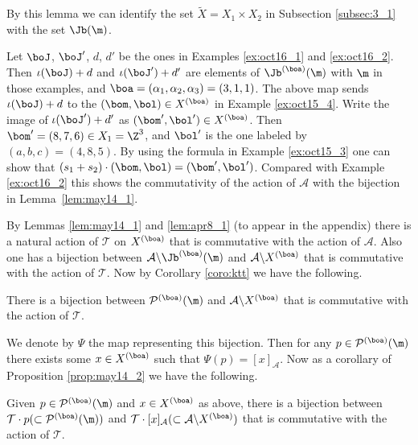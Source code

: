 By this lemma we can identify the set $\tilde{X} = X_1 \times X_2$ in Subsection \ref{subsec:3_1}
with the set
$\Jb (\m)$.

\begin{example}\label{ex:oct16_3}
Let $\boJ$, $\boJ'$, $d$, $d'$ be the ones in Examples \ref{ex:oct16_1} and \ref{ex:oct16_2}.
Then
$\iota (\boJ) + d$ and $\iota (\boJ') + d'$ are elements of $\Jb^{(\boa)} (\m)$ with
$\m$ in those examples, and $\boa = (\alpha_1, \alpha_2, \alpha_3) = (3,1,1)$.
%
The above map sends $\iota (\boJ) + d$ to the $(\bom, \bol) \in X^{(\boa)}$ in Example \ref{ex:oct15_4}.
Write the image of $\iota (\boJ') + d'$ as $(\bom', \bol') \in X^{(\boa)}$.
Then $\bom' = (8,7,6) \in X_1 = \Z^3$, and $\bol'$ is the one labeled by $(a,b,c) = (4,8,5)$.
%
By using the formula in Example \ref{ex:oct15_3} one can show that $(s_1 + s_2) \cdot (\bom, \bol) = (\bom', \bol')$.
Compared with Example \ref{ex:oct16_2} this shows the commutativity of the action of ${\mathcal A}$ with
the bijection in Lemma~\ref{lem:may14_1}.
\end{example}

By Lemmas \ref{lem:may14_1} and \ref{lem:apr8_1} (to appear in the appendix)
there is a natural action of ${\mathcal T}$ on $X^{(\boa)}$ that is commutative with the action of ${\mathcal A}$.
Also one has a bijection between {${\mathcal A} \backslash \Jb^{(\boa)} (\m)$} and
${\mathcal A} \backslash X^{(\boa)}$ that is commutative with the action of ${\mathcal T}$.
Now by Corollary \ref{coro:ktt} we have the following.
\begin{proposition}\label{prop:may14_2}
There is a bijection between ${\mathcal P}^{(\boa)}(\m)$ and ${\mathcal A} \backslash X^{(\boa)}$
that is commutative with the action of ${\mathcal T}$.
\end{proposition}
{We denote by $\Psi$ the map representing this bijection.
Then for any $p \in {\mathcal P}^{(\boa)}(\m)$ there exists some $x \in X^{(\boa)}$ such that
$\Psi (p) =  [x]_{\mathcal A}$.
Now as a corollary of Proposition \ref{prop:may14_2} we have the following.}
\begin{proposition}\label{prop:apr22_3}
Given $p \in {\mathcal P}^{(\boa)}(\m)$ and $x \in X^{(\boa)}$ as above,
there is a bijection between ${\mathcal T} \cdot p (\subset {\mathcal P}^{(\boa)}(\m))$
and ${\mathcal T} \cdot  [x]_{\mathcal A} (\subset {\mathcal A} \backslash X^{(\boa)})$
that is commutative with the action of ${\mathcal T}$.
\end{proposition}

